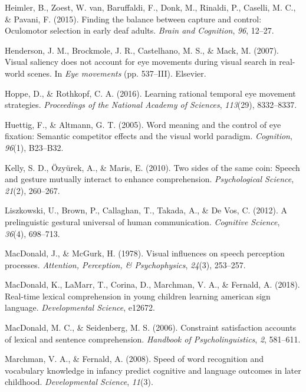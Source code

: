 \documentclass[,man,floatsintext]{apa6}
\begin{document}
\leavevmode\hypertarget{ref-heimler2015finding}{}%
Heimler, B., Zoest, W. van, Baruffaldi, F., Donk, M., Rinaldi, P.,
Caselli, M. C., \& Pavani, F. (2015). Finding the balance between
capture and control: Oculomotor selection in early deaf adults.
\emph{Brain and Cognition}, \emph{96}, 12--27.

\leavevmode\hypertarget{ref-henderson2007visual}{}%
Henderson, J. M., Brockmole, J. R., Castelhano, M. S., \& Mack, M.
(2007). Visual saliency does not account for eye movements during visual
search in real-world scenes. In \emph{Eye movements} (pp. 537--III).
Elsevier.

\leavevmode\hypertarget{ref-hoppe2016learning}{}%
Hoppe, D., \& Rothkopf, C. A. (2016). Learning rational temporal eye
movement strategies. \emph{Proceedings of the National Academy of
Sciences}, \emph{113}(29), 8332--8337.

\leavevmode\hypertarget{ref-huettig2005word}{}%
Huettig, F., \& Altmann, G. T. (2005). Word meaning and the control of
eye fixation: Semantic competitor effects and the visual world paradigm.
\emph{Cognition}, \emph{96}(1), B23--B32.

\leavevmode\hypertarget{ref-kelly2010two}{}%
Kelly, S. D., Özyürek, A., \& Maris, E. (2010). Two sides of the same
coin: Speech and gesture mutually interact to enhance comprehension.
\emph{Psychological Science}, \emph{21}(2), 260--267.

\leavevmode\hypertarget{ref-liszkowski2012prelinguistic}{}%
Liszkowski, U., Brown, P., Callaghan, T., Takada, A., \& De Vos, C.
(2012). A prelinguistic gestural universal of human communication.
\emph{Cognitive Science}, \emph{36}(4), 698--713.

\leavevmode\hypertarget{ref-macdonald1978visual}{}%
MacDonald, J., \& McGurk, H. (1978). Visual influences on speech
perception processes. \emph{Attention, Perception, \& Psychophysics},
\emph{24}(3), 253--257.

\leavevmode\hypertarget{ref-macdonald2018real}{}%
MacDonald, K., LaMarr, T., Corina, D., Marchman, V. A., \& Fernald, A.
(2018). Real-time lexical comprehension in young children learning
american sign language. \emph{Developmental Science}, e12672.

\leavevmode\hypertarget{ref-macdonald2006constraint}{}%
MacDonald, M. C., \& Seidenberg, M. S. (2006). Constraint satisfaction
accounts of lexical and sentence comprehension. \emph{Handbook of
Psycholinguistics}, \emph{2}, 581--611.

\leavevmode\hypertarget{ref-marchman2008speed}{}%
Marchman, V. A., \& Fernald, A. (2008). Speed of word recognition and
vocabulary knowledge in infancy predict cognitive and language outcomes
in later childhood. \emph{Developmental Science}, \emph{11}(3).
\end{document}

